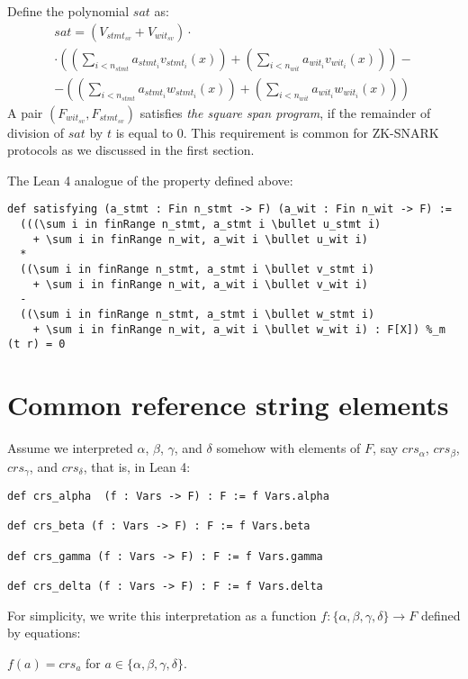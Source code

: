 \documentclass{article}
\theoremstyle{definition}
\theoremstyle{remark}
\begin{document}
Define the polynomial $sat$ as:
\begin{multline}
sat = (V_{{stmt}_{sv}} + V_{{wit}_{sv}}) \cdot \\ \cdot ((\sum \limits_{i < n_{stmt}} a_{{stmt}_i} v_{{stmt}_i}(x)) + (\sum \limits_{i < n_{wit}} a_{{wit}_i} v_{{wit}_i}(x) )) - \\ - ((\sum \limits_{i < n_{stmt}} a_{{stmt}_i} w_{{stmt}_i}(x)) + (\sum \limits_{i < n_{wit}} a_{{wit}_i} w_{{wit}_i}(x) ))
\end{multline}
A pair $(F_{{wit}_{sv}}, F_{{stmt}_{sv}})$ satisfies \emph{the square span program},
if the remainder of division of $sat$ by $t$ is equal to $0$.
This requirement is common for ZK-SNARK protocols as we discussed in the first section.

The Lean 4 analogue of the property defined above:
\begin{lstlisting}
def satisfying (a_stmt : Fin n_stmt -> F) (a_wit : Fin n_wit -> F) :=
  (((\sum i in finRange n_stmt, a_stmt i \bullet u_stmt i)
    + \sum i in finRange n_wit, a_wit i \bullet u_wit i)
  *
  ((\sum i in finRange n_stmt, a_stmt i \bullet v_stmt i)
    + \sum i in finRange n_wit, a_wit i \bullet v_wit i)
  -
  ((\sum i in finRange n_stmt, a_stmt i \bullet w_stmt i)
    + \sum i in finRange n_wit, a_wit i \bullet w_wit i) : F[X]) %_m (t r) = 0
\end{lstlisting}

\section{Common reference string elements}

Assume we interpreted $\alpha$, $\beta$, $\gamma$, and $\delta$ somehow with elements of $F$, say $crs_{\alpha}$, $crs_{\beta}$, $crs_{\gamma}$, and $crs_{\delta}$, that is, in Lean 4:

\begin{lstlisting}
def crs_alpha  (f : Vars -> F) : F := f Vars.alpha

def crs_beta (f : Vars -> F) : F := f Vars.beta

def crs_gamma (f : Vars -> F) : F := f Vars.gamma

def crs_delta (f : Vars -> F) : F := f Vars.delta
\end{lstlisting}

For simplicity, we write this interpretation as a function $f :  \{ \alpha,\beta,\gamma, \delta \} \to F$ defined by equations:
\begin{center}
$f(a) = crs_{a}$ for $a \in \{ \alpha,\beta,\gamma, \delta \}$.
\end{center}
\end{document}
